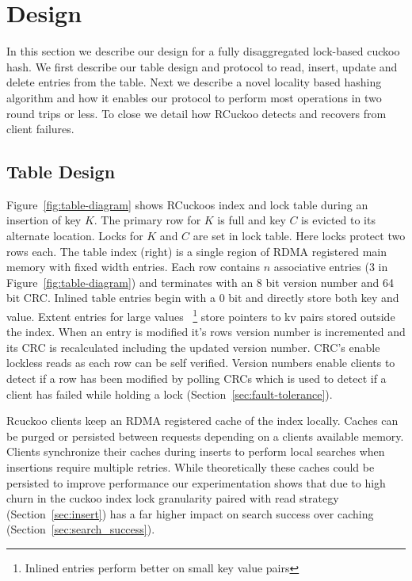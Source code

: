 \section{Design}
\label{sec:design}

In this section we describe our design for a fully
disaggregated lock-based cuckoo hash. We first describe our
table design and protocol to read, insert, update and delete
entries from the table. Next we describe a novel locality
based hashing algorithm and how it enables our protocol to
perform most operations in two round trips or less. To close
we detail how RCuckoo detects and recovers from client
failures.



\subsection{Table Design}
\label{sec:table-design}

Figure~\ref{fig:table-diagram} shows RCuckoos index and lock
table during an insertion of key $K$. The primary row for
$K$ is full and key $C$ is evicted to its alternate
location. Locks for $K$ and $C$ are set in lock table. Here
locks protect two rows each.
The table index (right) is a single region of RDMA
registered main memory with fixed width entries.  Each row
contains $n$ associative entries (3 in
Figure~\ref{fig:table-diagram}) and terminates with an 8 bit
version number and 64 bit CRC. Inlined table entries begin
with a 0 bit and directly store both key and value. Extent
entries for large values ~\footnote{Inlined entries perform
better on small key value pairs} store pointers to kv pairs
stored outside the index.
When an entry is modified it's rows version number is
incremented and its CRC is recalculated including the
updated version number. CRC's enable lockless reads as each
row can be self verified. Version numbers enable clients to
detect if a row has been modified by polling CRCs which is
used to detect if a client has failed while holding a lock
(Section~\ref{sec:fault-tolerance}).


Rcuckoo clients keep an RDMA registered cache of the index
locally. Caches can be purged or persisted between requests
depending on a clients available memory. Clients synchronize
their caches during inserts to perform local searches when
insertions require multiple retries. While theoretically
these caches could be persisted to improve performance our
experimentation shows that due to high churn in the cuckoo
index lock granularity paired with read strategy
(Section~\ref{sec:insert}) has a far higher impact on search
success over caching (Section~\ref{sec:search_success}).

